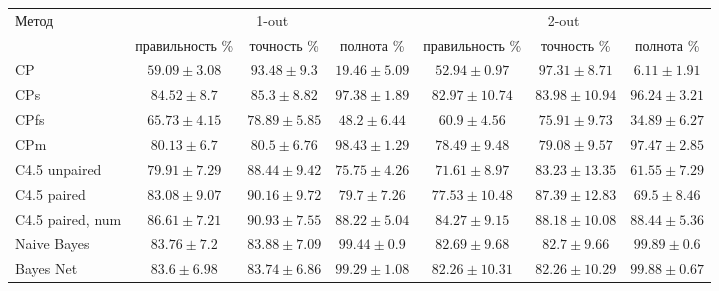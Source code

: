 	\begin{sidewaystable}[ht]
		\centering
		\begin{tabular}{|l|ccc|ccc|}
			\hline
			\multirow{2}{*}{Метод}   & \multicolumn{3}{c|}{1-out}                             & \multicolumn{3}{c|}{2-out}         \\ \cline{2-7}  
									 & правильность \%  & точность \%      & полнота \%       & правильность \%   & точность \%       & полнота \% \rule{0pt}{2.4ex} \\ \hline
			CP 						 & $59.09 \pm 3.08$ & $93.48 \pm 9.3$  & $19.46 \pm 5.09$ & $52.94 \pm 0.97$  & $97.31 \pm 8.71$  & $6.11 \pm 1.91$ \rule{0pt}{2.4ex} \\ 
			CPs 					 & $84.52 \pm 8.7$  & $85.3 \pm 8.82$  & $97.38 \pm 1.89$ & $82.97 \pm 10.74$ & $83.98 \pm 10.94$ & $96.24 \pm 3.21$ \\
			CPfs					 & $65.73 \pm 4.15$ & $78.89 \pm 5.85$ & $48.2 \pm 6.44$  & $60.9 \pm 4.56$   & $75.91 \pm 9.73$  & $34.89 \pm 6.27$ \\
			CPm						 & $80.13 \pm 6.7$  & $80.5 \pm 6.76 $ & $98.43 \pm 1.29$ & $78.49 \pm 9.48$  & $79.08 \pm 9.57$  & $97.47 \pm 2.85$ \\ 
			C4.5 unpaired			 & $79.91 \pm 7.29$ & $88.44 \pm 9.42$ & $75.75 \pm 4.26$ & $71.61 \pm 8.97$  & $83.23 \pm 13.35$ & $61.55 \pm 7.29$ \\ 
			C4.5 paired  			 & $83.08 \pm 9.07$ & $90.16 \pm 9.72$ & $79.7 \pm 7.26$  & $77.53 \pm 10.48$ & $87.39 \pm 12.83$ & $69.5 \pm 8.46$ \\ 
			C4.5 paired, num 	     & $86.61 \pm 7.21$ & $90.93 \pm 7.55$ & $88.22 \pm 5.04$ & $84.27 \pm 9.15$  & $88.18 \pm 10.08$ & $88.44 \pm 5.36$ \\
			Naive Bayes  			 & $83.76 \pm 7.2$  & $83.88 \pm 7.09$ & $99.44 \pm 0.9$  & $82.69 \pm 9.68$  & $82.7 \pm 9.66$   & $99.89 \pm 0.6$ \\ 
			Bayes Net  				 & $83.6 \pm 6.98$  & $83.74 \pm 6.86$ & $99.29 \pm 1.08$ & $82.26 \pm 10.31$ & $82.26 \pm 10.29$ & $99.88 \pm 0.67$ \\ 
			\hline
		\end{tabular}
		\label{tbl:cars_results}
	\end{sidewaystable}
	
